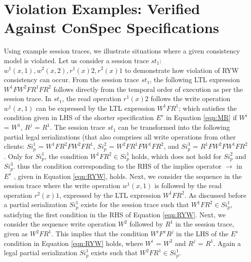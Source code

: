 \documentclass{sig-alternate-05-2015}
\begin{document}
\section{Violation Examples: Verified \\ Against ConSpec Specifications}
  Using example session traces, we illustrate situations where a given consistency model is violated. Let us consider a
session trace $\mathit{st}_1$: $w^1(x,1), w^2(x,2), r^1(x){2}, r^2(x){1}$ to demonstrate how violation of RYW consistency can occur.
 From the session trace $\mathit{st}_1$, the following LTL expression  \\ $W^1 F W^2 F R^1 F R^2$ follows
 directly from the temporal order of execution as per the session trace. In $\mathit{st}_1$, the read operation $r^1(x){2}$
 follows the write operation $w^1(x,1)$ can be expressed by the LTL expression $W^1 F R^1$; which satisfies the
 condition given in LHS of the shorter specification $E^{s}$ in Equation \ref{eqn:MR} if $W^i$ = $W^1$, $R^j$ = $R^1$. The session trace
 $\mathit{st}_1$ can be transformed into the following partial legal serializations (that also comprises all write operations from other
 clients: $\mathit{Si}_p^1$ = $W^1 F R^2 F W^2 F R^1$, $\mathit{Si}_p^2$ = $W^2 F R^1 F W^1 F R^2$,
  and $\mathit{Si}_p^3$ = $R^1 F W^2 F W^1 F R^2$.
 Only for $\mathit{Si}_p^1$, the condition $W^1 F R^2 \in \mathit{Si}_p^1$ holds, which does not hold for $\mathit{Si}_p^2$ and $\mathit{Si}_p^3$.
 thus the condition corresponding to the RHS of the implies operator $\rightarrow$ in $E^{s}$ , given in Equation \ref{eqn:RYW}, holds.
  Next, we consider the sequence in the session trace where the
   write operation $w^1(x,1)$ is followed by the read operation  $r^2(x){1}$, expressed by the LTL expression $W^1 F R^2$. As discussed before a partial
  serialization $\mathit{Si}_p^1$ exists for the session trace such that $W^1 F R^2 \in \mathit{Si}_p^1$, satisfying the first
  condition in the RHS of Equation \ref{eqn:RYW}.
  Next, we consider the sequence write operation $W^2$ followed by $R^1$ in the session trace, given as $W^2 F R^1$.
  This implies that the condition $W^i F^x R^j$ in the LHS of the $E^{s}$ condition in Equation \ref{eqn:RYW} holds, where $W^i$ = $W^2$ and
  $R^j$ = $R^1$. Again a legal partial serialization $\mathit{Si}_p^1$ exists such that $W^2 F R^1 \in \mathit{Si}_p^1$.
\end{document}
